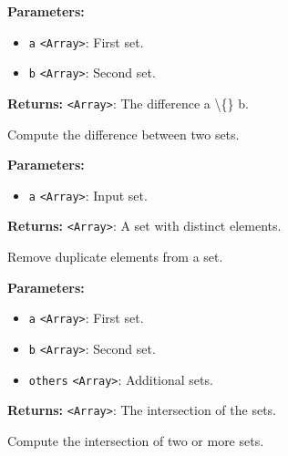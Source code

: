 \documentclass[12pt,a4paper]{article}
\begin{document}
\vspace{5mm}
\noindent {}


\noindent \textbf{Parameters:}
\begin{itemize}
  \item \texttt{a} \texttt{<Array>}: First set.
  \item \texttt{b} \texttt{<Array>}: Second set.
\end{itemize}

\noindent \textbf{Returns:} \texttt{<Array>}: The difference a \textbackslash\{\} b.

\noindent Compute the difference between two sets.

\vspace{5mm}
\noindent {}


\noindent \textbf{Parameters:}
\begin{itemize}
  \item \texttt{a} \texttt{<Array>}: Input set.
\end{itemize}

\noindent \textbf{Returns:} \texttt{<Array>}: A set with distinct elements.

\noindent Remove duplicate elements from a set.

\vspace{5mm}
\noindent {}


\noindent \textbf{Parameters:}
\begin{itemize}
  \item \texttt{a} \texttt{<Array>}: First set.
  \item \texttt{b} \texttt{<Array>}: Second set.
  \item \texttt{others} \texttt{<Array>}: Additional sets.
\end{itemize}

\noindent \textbf{Returns:} \texttt{<Array>}: The intersection of the sets.

\noindent Compute the intersection of two or more sets.

\vspace{5mm}
\noindent {}
\end{document}
